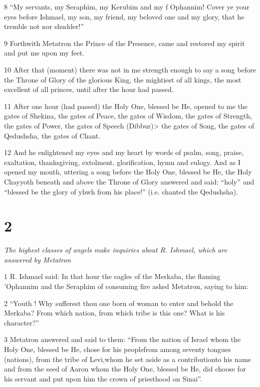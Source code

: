 \par 8 “My servants, my Seraphim, my Kerubim and my f Ophannim! Cover ye your eyes before Ishmael, my son, my friend, my beloved one and my glory, that he tremble not nor shudder!”

\par 9 Forthwith Metatron the Prince of the Presence, came and restored my spirit and put me upon my feet. 

\par 10 After that (moment) there was not in me strength enough to say a song before the Throne of Glory of the glorious King, the mightiest of all kings, the most excellent of all princes, until after the hour had passed. 

\par 11 After one hour (had passed) the Holy One, blessed be He, opened to me the gates of Shekina, the gates of Peace, the gates of Wisdom, the gates of Strength, the gates of Power, the gates of Speech (Dibbur)> the gates of Song, the gates of Qedushsha, the gates of Chant. 

\par 12 And he enlightened my eyes and my heart by words of psalm, song, praise, exaltation, thanksgiving, extolment, glorification, hymn and eulogy. And as I opened my mouth, uttering a song before the Holy One, blessed be He, the Holy Chayyoth beneath and above the Throne of Glory answered and said: “holy” and “blessed be the glory of yhwh from his place!” (i.e. chanted the Qedushsha).

\chapter{2}

\par \textit{The highest classes of angels make inquiries about R. Ishmael, which are answered by Metatron}

\par 1 R. Ishmael said: In that hour the eagles of the Merkaba, the flaming 'Ophannim and the Seraphim of consuming fire asked Metatron, saying to him:

\par 2 “Youth ! Why sufferest thou one born of woman to enter and behold the Merkaba? From which nation, from which tribe is this one? What is his character?”

\par 3 Metatron answered and said to them: “From the nation of Israel whom the Holy One, blessed be He, chose for his peoplefrom among seventy tongues (nations), from the tribe of Levi,whom he set aside as a contributionto his name and from the seed of Aaron whom the Holy One, blessed be He, did choose for his servant and put upon him the crown of priesthood on Sinai”. 

